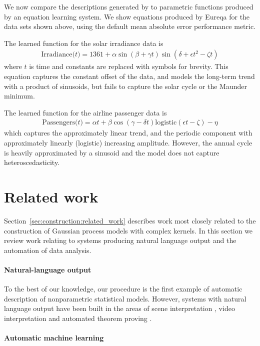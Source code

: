 We now compare the descriptions generated by \procedurename{} to parametric functions produced by an equation learning system.
We show equations produced by Eureqa \citep{Eureqa} for the data sets shown above, using the default mean absolute error performance metric.

The learned function for the solar irradiance data is
\begin{align*}
\textrm{Irradiance($t$)} = 1361 + \alpha\sin(\beta + \gamma t)\sin(\delta + \epsilon t^2 - \zeta t)
\end{align*}
where $t$ is time and constants are replaced with symbols for brevity.
This equation captures the constant offset of the data, and models the long-term trend with a product of sinusoids, but fails to capture the solar cycle or the Maunder minimum.

The learned function for the airline passenger data is
\begin{align*}
\textrm{Passengers($t$)} = \alpha t + \beta\cos(\gamma - \delta t)\textrm{logistic}(\epsilon t - \zeta) - \eta
\end{align*}
which captures the approximately linear trend, and the periodic component with approximately linearly (logistic) increasing amplitude.
However, the annual cycle is heavily approximated by a sinusoid and the model does not capture heteroscedasticity.

\section{Related work}
\label{sec:related-work}

Section~\ref{sec:construction:related_work} describes work most closely related to the construction of Gaussian process models with complex kernels.
In this section we review work relating to systems producing natural language output and the automation of data analysis.

\paragraph{Natural-language output}
To the best of our knowledge, our procedure is the first example of automatic description of nonparametric statistical models.
However, systems with natural language output have been built in the areas of scene interpretation \citep{Karpathy_undated-ww}, video interpretation \citep{Barbu2012-wv} and automated theorem proving \citep{Ganesalingam_undated-us}.

\paragraph{Automatic machine learning}

